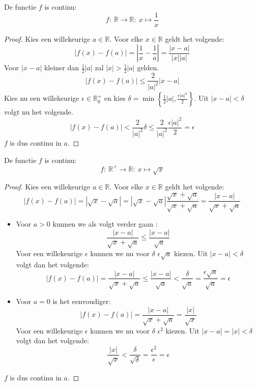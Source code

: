 \documentclass[main.tex]{subfiles}
\begin{document}
\begin{vb}
  De functie $f$ is continu:
  \[ f:\ \mathbb{R} \rightarrow \mathbb{R}:\ x \mapsto \frac{1}{x} \]
  
  \begin{proof}
    Kies een willekeurige $a \in \mathbb{R}$.
    Voor elke $x \in \mathbb{R}$ geldt het volgende:
    \[ |f(x)-f(a)| = \left|\frac{1}{x}-\frac{1}{a}\right| = \frac{|x-a|}{|x||a|} \]
    Voor $|x-a|$ kleiner dan $\frac{1}{2}|a|$ zal $|x| > \frac{1}{2}|a|$ gelden.
    \[ |f(x)-f(a)| \le \frac{2}{|a|^{2}}|x-a| \]
    Kies nu een willekeurige $\epsilon \in \mathbb{R}_{0}^{+}$ en kies $\delta = \min\left\{ \frac{1}{2}|a|, \frac{\epsilon|a|^{2}}{2} \right\}$.
    Uit $|x-a|< \delta$ volgt nu het volgende.
    \[ |f(x)-f(a)| < \frac{2}{|a|^{2}}\delta \le \frac{2}{|a|^{2}}\frac{\epsilon|a|^{2}}{2} = \epsilon \]
    $f$ is dus continu in $a$.
  \end{proof}
\end{vb}

\begin{vb}
  De functie $f$ is continu:
  \[ f:\ \mathbb{R}^{+} \rightarrow \mathbb{R}:\ x \mapsto \sqrt{x} \]

  \begin{proof}
    Kies een willekeurige $a \in \mathbb{R}$.
    Voor elke $x \in \mathbb{R}$ geldt het volgende:
    \[ |f(x)-f(a)| = |\sqrt{x}-\sqrt{a}| = \left|\sqrt{x}-\sqrt{a}\right|\frac{\sqrt{x}+\sqrt{a}}{\sqrt{x}+\sqrt{a}} = \frac{|x-a|}{\sqrt{x}+\sqrt{a}} \]
    \begin{itemize}
    \item Voor $a>0$ kunnen we als volgt verder gaan :
      \[ \frac{|x-a|}{\sqrt{x}+\sqrt{a}} \le \frac{|x-a|}{\sqrt{a}} \]
      Voor een willekeurige $\epsilon$ kunnen we nu voor $\delta$ $\epsilon\sqrt{a}$ kiezen.
      Uit $|x-a|< \delta$ volgt dan het volgende:
      \[ |f(x)-f(a)| = \frac{|x-a|}{\sqrt{x}+\sqrt{a}} \le \frac{|x-a|}{\sqrt{a}} < \frac{\delta}{\sqrt{a}} = \frac{\epsilon\sqrt{a}}{\sqrt{a}} = \epsilon \]
    \item Voor $a=0$ is het eenvoudiger:
      \[ |f(x)-f(a)| =  \frac{|x-a|}{\sqrt{x}+\sqrt{a}} = \frac{|x|}{\sqrt{x}} \]
      Voor een willekeurige $\epsilon$ kunnen we nu voor $\delta$ $\epsilon^{2}$ kiezen. 
      Uit $|x-a|=|x|< \delta$ volgt dan het volgende:
      \[ \frac{|x|}{\sqrt{x}} < \frac{\delta}{\sqrt{\delta}} = \frac{\epsilon^{2}}{\epsilon} = \epsilon \]
    \end{itemize}
    $f$ is dus continu in $a$.
  \end{proof}
\end{vb}
\end{document}
